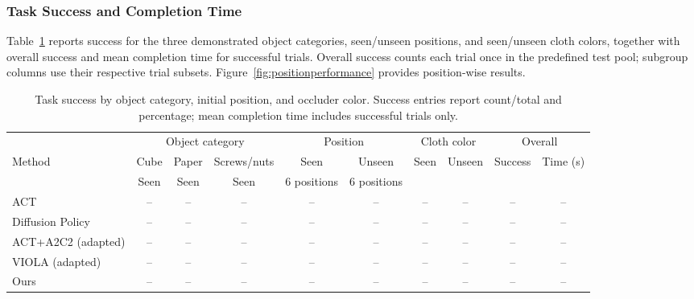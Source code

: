 \subsubsection{Task Success and Completion Time}
Table~\ref{tab:mainresults} reports success for the three demonstrated object categories, seen/unseen positions, and seen/unseen cloth colors, together with overall success and mean completion time for successful trials.
Overall success counts each trial once in the predefined test pool; subgroup columns use their respective trial subsets.
Figure~\ref{fig:positionperformance} provides position-wise results.

\begin{table}[!t]
\caption{Task success by object category, initial position, and occluder color. Success entries report count/total and percentage; mean completion time includes successful trials only.}
\label{tab:mainresults}
\centering\small
\setlength{\tabcolsep}{4pt}
\begin{tabular}{lccccccccc}
\toprule
& \multicolumn{3}{c}{Object category} & \multicolumn{2}{c}{Position} & \multicolumn{2}{c}{Cloth color} & \multicolumn{2}{c}{Overall}\\
\cmidrule(lr){2-4}\cmidrule(lr){5-6}\cmidrule(lr){7-8}\cmidrule(lr){9-10}
Method & Cube & Paper & Screws/nuts & Seen & Unseen & Seen & Unseen & Success & Time (s)\\
& Seen & Seen & Seen & 6 positions & 6 positions & & & & \\
\midrule
ACT & -- & -- & -- & -- & -- & -- & -- & -- & --\\
Diffusion Policy & -- & -- & -- & -- & -- & -- & -- & -- & --\\
ACT+A2C2 (adapted) & -- & -- & -- & -- & -- & -- & -- & -- & --\\
VIOLA (adapted) & -- & -- & -- & -- & -- & -- & -- & -- & --\\
Ours & -- & -- & -- & -- & -- & -- & -- & -- & --\\
\bottomrule
\end{tabular}
\end{table}

